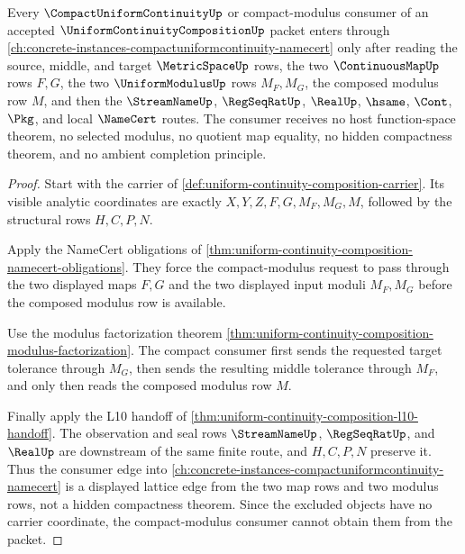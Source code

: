 \begin{theorem}
\label{thm:uniform-continuity-composition-compact-modulus-consumer}
Every $\CompactUniformContinuityUp$ or compact-modulus consumer of an accepted $\UniformContinuityCompositionUp$ packet enters through \autoref{ch:concrete-instances-compactuniformcontinuity-namecert} only after reading the source, middle, and target $\MetricSpaceUp$ rows, the two $\ContinuousMapUp$ rows $F,G$, the two $\UniformModulusUp$ rows $M_F,M_G$, the composed modulus row $M$, and then the $\StreamNameUp$, $\RegSeqRatUp$, $\RealUp$, $\hsame$, $\Cont$, $\Pkg$, and local $\NameCert$ routes. The consumer receives no host function-space theorem, no selected modulus, no quotient map equality, no hidden compactness theorem, and no ambient completion principle.
\end{theorem}
\begin{proof}
Start with the carrier of \autoref{def:uniform-continuity-composition-carrier}. Its visible analytic coordinates are exactly $X,Y,Z,F,G,M_F,M_G,M$, followed by the structural rows $H,C,P,N$.

Apply the NameCert obligations of \autoref{thm:uniform-continuity-composition-namecert-obligations}. They force the compact-modulus request to pass through the two displayed maps $F,G$ and the two displayed input moduli $M_F,M_G$ before the composed modulus row is available.

Use the modulus factorization theorem \autoref{thm:uniform-continuity-composition-modulus-factorization}. The compact consumer first sends the requested target tolerance through $M_G$, then sends the resulting middle tolerance through $M_F$, and only then reads the composed modulus row $M$.

Finally apply the L10 handoff of \autoref{thm:uniform-continuity-composition-l10-handoff}. The observation and seal rows $\StreamNameUp$, $\RegSeqRatUp$, and $\RealUp$ are downstream of the same finite route, and $H,C,P,N$ preserve it. Thus the consumer edge into \autoref{ch:concrete-instances-compactuniformcontinuity-namecert} is a displayed lattice edge from the two map rows and two modulus rows, not a hidden compactness theorem. Since the excluded objects have no carrier coordinate, the compact-modulus consumer cannot obtain them from the packet.
\end{proof}

